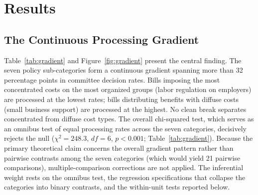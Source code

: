 \documentclass[11pt]{article}
\begin{document}

\section{Results}
\label{sec:results}

\subsection{The Continuous Processing Gradient}

Table~\ref{tab:gradient} and Figure~\ref{fig:gradient} present the central finding. The seven policy sub-categories form a continuous gradient spanning more than 32 percentage points in committee decision rates. Bills imposing the most concentrated costs on the most organized groups (labor regulation on employers) are processed at the lowest rates; bills distributing benefits with diffuse costs (small business support) are processed at the highest. No clean break separates concentrated from diffuse cost types. The overall chi-squared test, which serves as an omnibus test of equal processing rates across the seven categories, decisively rejects the null ($\chi^2 = 248.3$, $df = 6$, $p < 0.001$; Table~\ref{tab:gradient}). Because the primary theoretical claim concerns the overall gradient pattern rather than pairwise contrasts among the seven categories (which would yield 21 pairwise comparisons), multiple-comparison corrections are not applied. The inferential weight rests on the omnibus test, the regression specifications that collapse the categories into binary contrasts, and the within-unit tests reported below.
\end{document}
